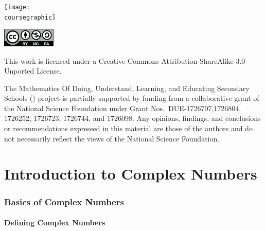 \documentclass[11pt]{article}
\theoremstyle{definition}
\begin{document}
\maketitle
\ifthenelse{\equal{\coursegraphic}{}} %
	{}
	{\begin{center}\texttt{[image: \\coursegraphic]}\end{center}}
	
\vfill 
\begin{center} \includegraphics[width=1in]{by-nc-sa.png} \end{center}
\footnotesize{ This work is licensed under a Creative Commons Attribution-ShareAlike 3.0 Unported License. }

\footnotesize{
The Mathematics Of Doing, Understand, Learning, and Educating Secondary Schools (\MODULES) project is partially supported by funding from a collaborative grant of the National Science Foundation under Grant Nos.~DUE-1726707,1726804, 1726252, 1726723, 1726744, and 1726098.  Any opinions, findings, and conclusions or recommendations expressed in this material are those of the authors and do not necessarily reflect the views of the National Science Foundation.}
\newpage
\thispagestyle{plain}   
\listoftodos
\tableofcontents
\newpage {}
\newpage 

\part{Introduction to Complex Numbers}

\section{Basics of Complex Numbers} \label{section: basics of complex numbers}

\subsection{Defining Complex Numbers}
\end{document}
